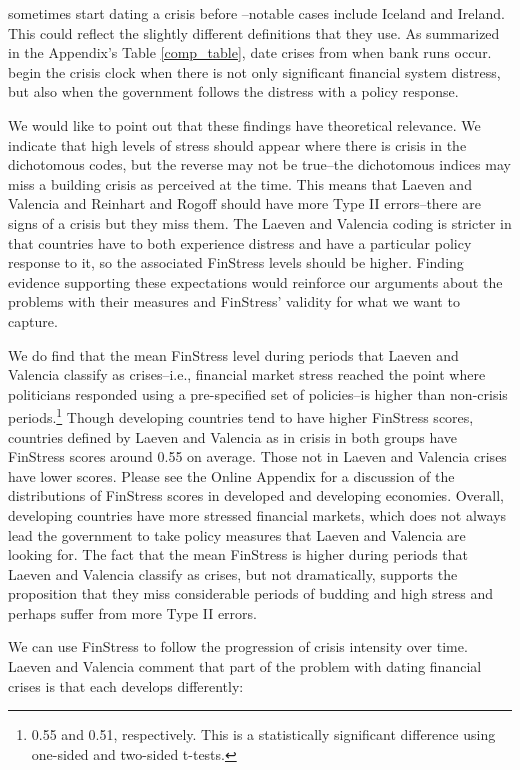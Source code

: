 \documentclass[]{article}
\begin{document}
\cite{Reinhart2009} sometimes start dating a crisis before \cite{laeven2013}--notable cases include Iceland and Ireland. This could reflect the slightly different definitions that they use. As summarized in the Appendix's Table \ref{comp_table}, \cite{Reinhart2009} date crises from when bank runs occur. \cite{laeven2013} begin the crisis clock when there is not only significant financial system distress, but also when the government follows the distress with a policy response.

We would like to point out that these findings have theoretical relevance. We indicate that high levels of stress should appear where there is crisis in the dichotomous codes, but the reverse may not be true--the dichotomous indices may miss a building crisis as perceived at the time. This means that Laeven and Valencia and Reinhart and Rogoff should have more Type II errors--there are signs of a crisis but they miss them. The Laeven and Valencia coding is stricter in that countries have to both experience distress and have a particular policy response to it, so the associated FinStress levels should be higher. Finding evidence supporting these expectations would reinforce our arguments about the problems with their measures and FinStress' validity for what we want to capture.

We do find that the mean FinStress level during periods that Laeven and Valencia classify as crises--i.e., financial market stress reached the point where politicians responded using a pre-specified set of policies--is higher than non-crisis periods.\footnote{0.55 and 0.51, respectively. This is a statistically significant difference using one-sided and two-sided t-tests.} Though developing countries tend to have higher FinStress scores, countries defined by Laeven and Valencia as in crisis in both groups have FinStress scores around 0.55 on average. Those not in Laeven and Valencia crises have lower scores. Please see the Online Appendix for a discussion of the distributions of FinStress scores in developed and developing economies. Overall, developing countries have more stressed financial markets, which does not always lead the government to take policy measures that Laeven and Valencia are looking for. The fact that the mean FinStress is higher during periods that Laeven and Valencia classify as crises, but not dramatically, supports the proposition that they miss considerable periods of budding and high stress and perhaps suffer from more Type II errors.

We can use FinStress to follow the progression of crisis intensity over time. Laeven and Valencia \citeyearpar[227]{laeven2013} comment that part of the problem with dating financial crises is that each develops differently:
\end{document}
